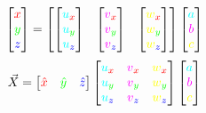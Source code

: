 \documentclass[preview]{standalone}
\begin{document}
$$\begin{bmatrix}\textcolor[HTML]{FF0000}{x}\\\textcolor[HTML]{00FF00}{y}\\\textcolor[HTML]{0000FF}{z}\end{bmatrix} = \begin{bmatrix}
\begin{bmatrix}\textcolor[HTML]{00FFFF}{u}_{\textcolor[HTML]{FF0000}{x}}\\\textcolor[HTML]{00FFFF}{u}_{\textcolor[HTML]{00FF00}{y}}\\\textcolor[HTML]{00FFFF}{u}_{\textcolor[HTML]{0000FF}{z}}\end{bmatrix} &
\begin{bmatrix}\textcolor[HTML]{FF00FF}{v}_{\textcolor[HTML]{FF0000}{x}}\\\textcolor[HTML]{FF00FF}{v}_{\textcolor[HTML]{00FF00}{y}}\\\textcolor[HTML]{FF00FF}{v}_{\textcolor[HTML]{0000FF}{z}}\end{bmatrix} &
\begin{bmatrix}\textcolor[HTML]{FFFF00}{w}_{\textcolor[HTML]{FF0000}{x}}\\\textcolor[HTML]{FFFF00}{w}_{\textcolor[HTML]{00FF00}{y}}\\\textcolor[HTML]{FFFF00}{w}_{\textcolor[HTML]{0000FF}{z}}\end{bmatrix}
\end{bmatrix}\begin{bmatrix}\textcolor[HTML]{00FFFF}{a}\\\textcolor[HTML]{FF00FF}{b}\\\textcolor[HTML]{FFFF00}{c}\end{bmatrix}$$
$$\vec{X} = \begin{bmatrix}\textcolor[HTML]{FF0000}{\hat{x}}&\textcolor[HTML]{00FF00}{\hat{y}}&\textcolor[HTML]{0000FF}{\hat{z}}\end{bmatrix}\begin{bmatrix}
\textcolor[HTML]{00FFFF}{u}_{\textcolor[HTML]{FF0000}{x}}&\textcolor[HTML]{FF00FF}{v}_{\textcolor[HTML]{FF0000}{x}}&\textcolor[HTML]{FFFF00}{w}_{\textcolor[HTML]{FF0000}{x}}\\
\textcolor[HTML]{00FFFF}{u}_{\textcolor[HTML]{00FF00}{y}}&\textcolor[HTML]{FF00FF}{v}_{\textcolor[HTML]{00FF00}{y}}&\textcolor[HTML]{FFFF00}{w}_{\textcolor[HTML]{00FF00}{y}}\\
\textcolor[HTML]{00FFFF}{u}_{\textcolor[HTML]{0000FF}{z}}&\textcolor[HTML]{FF00FF}{v}_{\textcolor[HTML]{0000FF}{z}}&\textcolor[HTML]{FFFF00}{w}_{\textcolor[HTML]{0000FF}{z}}
\end{bmatrix}\begin{bmatrix}\textcolor[HTML]{00FFFF}{a}\\\textcolor[HTML]{FF00FF}{b}\\\textcolor[HTML]{FFFF00}{c}\end{bmatrix}$$
\end{document}

